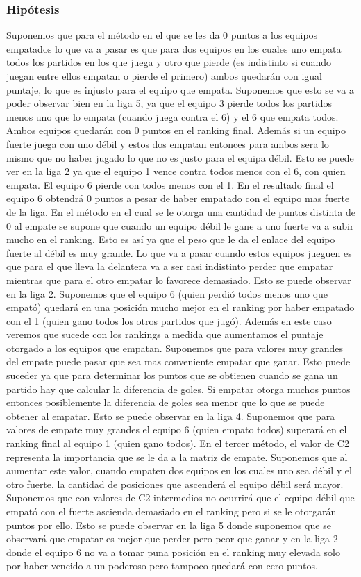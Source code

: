             \subsubsection*{Hipótesis}
            Suponemos que para el método en el que se les da 0 puntos a los equipos empatados lo que va a pasar es que para dos equipos en los cuales uno empata todos los partidos en los que juega y otro que pierde (es indistinto si cuando juegan entre ellos empatan o pierde el primero) ambos quedarán con igual puntaje, lo que es injusto para el equipo que empata. Suponemos que esto se va a poder observar bien en la liga 5, ya que el equipo 3 pierde todos los partidos menos uno que lo empata (cuando juega contra el 6) y el 6 que empata todos. Ambos equipos quedarán con 0 puntos en el ranking final. Además si un equipo fuerte juega con uno débil y estos dos empatan entonces para ambos sera lo mismo que no haber jugado lo que no es justo para el equipa débil. Esto se puede ver en la liga 2 ya que el equipo 1 vence contra todos menos con el 6, con quien empata. El equipo 6 pierde con todos menos con el 1. En el resultado final el equipo 6 obtendrá 0 puntos a pesar de haber empatado con el equipo mas fuerte de la liga.
            En el método en el cual se le otorga una cantidad de puntos distinta de 0 al empate se supone que cuando un equipo débil le gane a uno fuerte va a subir mucho en el ranking. Esto es así ya que el peso que le da el enlace del equipo fuerte al débil es muy grande. Lo que va a pasar cuando estos equipos jueguen es que para el que lleva la delantera va a ser casi indistinto perder que empatar mientras que para el otro empatar lo favorece demasiado. Esto se puede observar en la liga 2. Suponemos que el equipo 6 (quien perdió todos menos uno que empató) quedará en una posición mucho mejor en el ranking por haber empatado con el 1 (quien gano todos los otros partidos que jugó). Además en este caso veremos que sucede con los rankings a medida que aumentamos el puntaje otorgado a los equipos que empatan. Suponemos que para valores muy grandes del empate puede pasar que sea mas conveniente empatar que ganar. Esto puede suceder ya que para determinar los puntos que se obtienen cuando se gana un partido hay que calcular la diferencia de goles. Si empatar otorga muchos puntos entonces posiblemente la diferencia de goles sea menor que lo que se puede obtener al empatar. Esto se puede observar en la liga 4. Suponemos que para valores de empate muy grandes el equipo 6 (quien empato todos) superará en el ranking final al equipo 1 (quien gano todos).
            En el tercer método, el valor de C2 representa la importancia que se le da a la matriz de empate. Suponemos que al aumentar este valor, cuando empaten dos equipos en los cuales uno sea débil y el otro fuerte, la cantidad de posiciones que ascenderá el equipo débil será mayor. Suponemos que con valores de C2 intermedios no ocurrirá que el equipo débil que empató con el fuerte ascienda demasiado en el ranking pero si se le otorgarán puntos por ello. Esto se puede observar en la liga 5 donde suponemos que se observará que empatar es mejor que perder pero peor que ganar y en la liga 2 donde el equipo 6 no va a tomar puna posición en el ranking muy elevada solo por haber vencido a un poderoso pero tampoco quedará con cero puntos.

